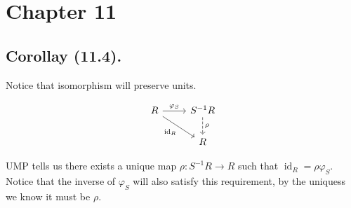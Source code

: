 \section{Chapter 11}

\subsection{Corollay (11.4).}

Notice that isomorphism will preserve units.

\[\begin{tikzcd}
	R & {S^{-1}R} \\
	& R
	\arrow["{\varphi_S}", from=1-1, to=1-2]
	\arrow["{\operatorname{id}_R}"', from=1-1, to=2-2]
	\arrow["\rho", dashed, from=1-2, to=2-2]
\end{tikzcd}\]

UMP tells us there exists a unique map $\rho:S^{-1}R\to R$ such that $\operatorname{id}_R=\rho\varphi_S$. Notice that the inverse of $\varphi_S$ will also satisfy this requirement, by the uniquess we know it must be $\rho$.